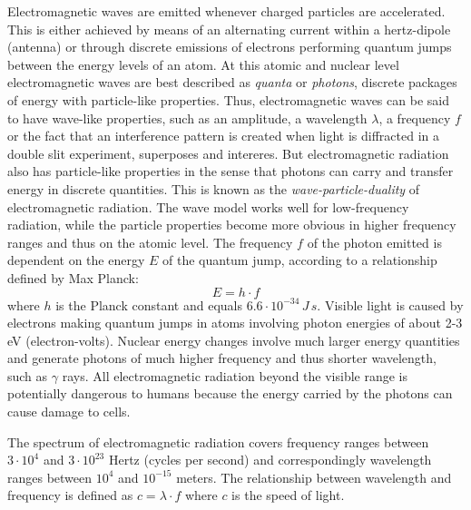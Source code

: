 Electromagnetic waves are emitted whenever charged particles are accelerated. This is either achieved by means of an alternating current within a hertz-dipole (antenna) or through discrete emissions of electrons performing quantum jumps between the energy levels of an atom. At this atomic and nuclear level electromagnetic waves are best described as \emph{quanta} or \emph{photons}, discrete packages of energy with particle-like properties. Thus, electromagnetic waves can be said to have wave-like properties, such as an amplitude, a wavelength $\lambda$, a frequency $f$ or the fact that an interference pattern is created when light is diffracted in a double slit experiment, superposes and intereres. But electromagnetic radiation also has particle-like properties in the sense that photons can carry and transfer energy in discrete quantities. This is known as the \emph{wave-particle-duality} of electromagnetic radiation. The wave model works well for low-frequency radiation, while the particle properties become more obvious in higher frequency ranges and thus on the atomic level. The frequency $f$ of the photon emitted is dependent on the energy $E$ of the quantum jump, according to a relationship defined by Max Planck: $$E = h \cdot f$$ where $h$ is the Planck constant and equals $6.6 \cdot 10^{-34} \, J\, s$. Visible light is caused by electrons making quantum jumps in atoms involving photon energies of about 2-3 eV (electron-volts). Nuclear energy changes involve much larger energy quantities and generate photons of much higher frequency and thus shorter wavelength, such as $\gamma$ rays. All electromagnetic radiation beyond the visible range is potentially dangerous to humans because the energy carried by the photons can cause damage to cells.


The spectrum of electromagnetic radiation covers frequency ranges between $3 \cdot 10^4$ and $3 \cdot 10^{23}$ Hertz (cycles per second) and correspondingly wavelength ranges between $10^4$ and $10^{-15}$ meters. The relationship between wavelength and frequency is defined as $c = \lambda \cdot f$ where $c$ is the speed of light.

\pagebreak

